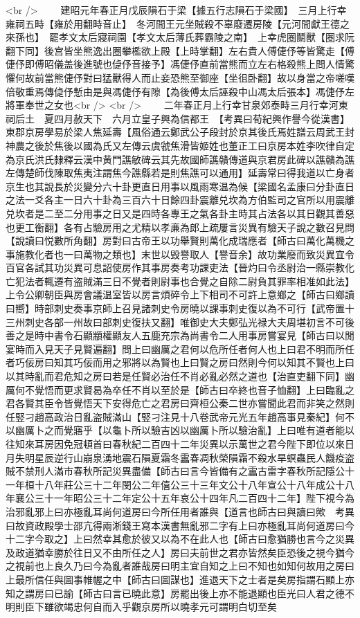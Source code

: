 <br />
　　建昭元年春正月戊辰隕石于梁【據五行志隕石于梁國】　三月上行幸雍祠五畤【雍於用翻畤音止】　冬河間王元坐賊殺不辜廢遷房陵【元河間獻王德之來孫也】　罷孝文太后寢祠園【孝文太后薄氏葬霸陵之南】　上幸虎圈鬬獸【圈求阮翻下同】後宫皆坐熊逸出圈攀檻欲上殿【上時掌翻】左右貴人傅倢伃等皆驚走【傅倢伃即傅昭儀盖後進號也偼伃音接予】馮倢伃直前當熊而立左右格殺熊上問人情驚懼何故前當熊倢伃對曰猛獸得人而止妾恐熊至御座【坐徂卧翻】故以身當之帝嗟嘆倍敬重焉傳偼伃慙由是與馮倢伃有隙【為後傅太后誣殺中山馮太后張本】馮倢伃左將軍奉世之女也<br />
<br />
　　二年春正月上行幸甘泉郊泰畤三月行幸河東祠后土　夏四月赦天下　六月立皇子興為信都王　【考異曰荀紀興作譽今從漢書】　東郡京房學易於梁人焦延壽【風俗通云鄭武公子段封於京其後氏焉姓譜云周武王封神農之後於焦後以國為氏又左傳云虞虢焦滑皆姬姓也董正工曰京房本姓李吹律自定為京氏洪氏隸釋云漢中黄門譙敏碑云其先故國師譙贛傳道與京君房此碑以譙贛為譙左傳楚師伐陳取焦夷注謂焦今譙縣若是則焦譙可以通用】延壽常曰得我道以亡身者京生也其說長於災變分六十卦更直日用事以風雨寒温為候【梁國名孟康曰分卦直日之法一爻各主一日六十卦為三百六十日餘四卦震離兑坎為方伯監司之官所以用震離兑坎者是二至二分用事之日又是四時各專王之氣各卦主時其占法各以其日觀其善惡也更工衡翻】各有占驗房用之尤精以孝亷為郎上疏屢言災異有驗天子說之數召見問【說讀曰悦數所角翻】房對曰古帝王以功舉賢則萬化成瑞應者【師古曰萬化萬機之事施教化者也一曰萬物之類也】末世以毁譽取人【譽音余】故功業廢而致災異宜令百官各試其功災異可息詔使房作其事房奏考功課吏法【晉灼曰令丞尉治一縣崇教化亡犯法者輒遷有盗賊滿三日不覺者則尉事也合覺之自除二尉負其罪率相准如此法】上令公卿朝臣與房會議温室皆以房言煩碎令上下相司不可許上意鄉之【師古曰鄉讀曰嚮】時部刺史奏事京師上召見諸刺史令房曉以課事刺史復以為不可行【武帝置十三州刺史各部一州故曰部刺史復扶又翻】唯御史大夫鄭弘光禄大夫周堪初言不可後善之是時中書令石顯顓權顯友人五鹿充宗為尚書令二人用事房嘗宴見【師古曰以閒宴時而入見天子見賢遍翻】問上曰幽厲之君何以危所任者何人也上曰君不明而所任者巧佞房曰知其巧佞而用之邪將以為賢也上曰賢之房曰然則今何以知其不賢也上曰以其時亂而君危知之房曰若是任賢必治任不肖必亂必然之道也【治直吏翻下同】幽厲何不覺悟而更求賢曷為卒任不肖以至於是【師古曰卒終也音子恤翻】上曰臨亂之君各賢其臣令皆覺悟天下安得危亡之君房曰齊桓公秦二世亦嘗聞此君而非笑之然則任竪刁趙高政治日亂盗賊滿山【竪刁注見十八卷武帝元光五年趙高事見秦紀】何不以幽厲卜之而覺寤乎【以龜卜所以驗吉凶以幽厲卜所以驗治亂】上曰唯有道者能以往知來耳房因免冠頓首曰春秋紀二百四十二年災異以示萬世之君今陛下即位以來日月失明星辰逆行山崩泉湧地震石隕夏霜冬靁春凋秋榮隕霜不殺水旱螟蟲民人饑疫盗賊不禁刑人滿市春秋所記災異盡備【師古曰言今皆備有之靁古雷字春秋所記隱公十一年桓十八年莊公三十二年閔公二年僖公三十三年文公十八年宣公十八年成公十八年襄公三十一年昭公三十二年定公十五年哀公十四年凡二百四十二年】陛下視今為治邪亂邪上曰亦極亂耳尚何道房曰今所任用者誰與【道言也師古曰與讀曰歟　考異曰故資政殿學士邵亢得兩淅錢王寫本漢書無亂邪二字有上曰亦極亂耳尚何道房曰今十二字今取之】上曰然幸其愈於彼又以為不在此人也【師古曰愈猶勝也言今之災異及政道猶幸勝於往日又不由所任之人】房曰夫前世之君亦皆然矣臣恐後之視今猶今之視前也上良久乃曰今為亂者誰哉房曰明主宜自知之上曰不知也如知何故用之房曰上最所信任與圖事帷幄之中【師古曰圖謀也】進退天下之士者是矣房指謂石顯上亦知之謂房曰已諭【師古曰言已曉此意】房罷出後上亦不能退顯也臣光曰人君之德不明則臣下雖欲竭忠何自而入乎觀京房所以曉孝元可謂明白切至矣